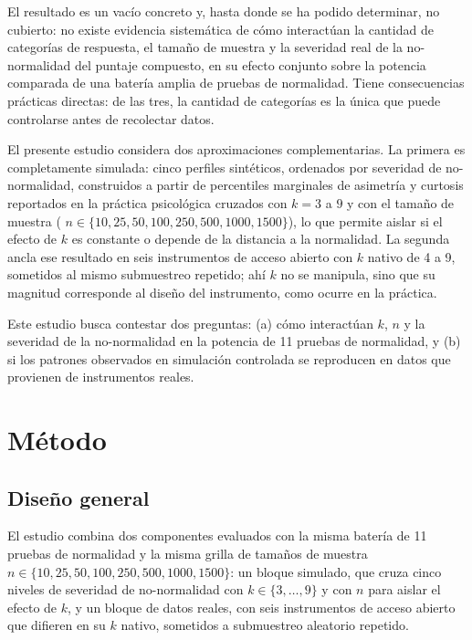 \documentclass[man,mask,donotrepeattitle,floatsintext]{apa7}
\begin{document}
El resultado es un vacío concreto y, hasta donde se ha podido determinar, no cubierto: no existe evidencia sistemática de cómo interactúan la cantidad de categorías de respuesta, el tamaño de muestra y la severidad real de la no-normalidad del puntaje compuesto, en su efecto conjunto sobre la potencia comparada de una batería amplia de pruebas de normalidad. Tiene consecuencias prácticas directas: de las tres, la cantidad de categorías es la única que puede controlarse antes de recolectar datos.

El presente estudio considera dos aproximaciones complementarias. La primera es completamente simulada: cinco perfiles sintéticos, ordenados por severidad de no-normalidad, construidos a partir de percentiles marginales de asimetría y curtosis reportados en la práctica psicológica \parencite{cain2017} cruzados con $k=3$ a $9$ y con el tamaño de muestra ( $n \in \{10, 25, 50, 100, 250, 500, 1000, 1500\}$), lo que permite aislar si el efecto de $k$ es constante o depende de la distancia a la normalidad. La segunda ancla ese resultado en seis instrumentos de acceso abierto con $k$ nativo de 4 a 9, sometidos al mismo submuestreo repetido; ahí $k$ no se manipula, sino que su magnitud corresponde al diseño del instrumento, como ocurre en la práctica.

Este estudio busca contestar dos preguntas: (a) cómo interactúan $k$, $n$ y la severidad de la no-normalidad en la potencia de 11 pruebas de normalidad, y (b) si los patrones observados en simulación controlada se reproducen en datos que provienen de instrumentos reales.

\section{Método}
\label{sec:method}

\subsection{Diseño general}
\label{sec:design}

El estudio combina dos componentes evaluados con la misma batería de 11 pruebas de normalidad y la misma grilla de tamaños de muestra $n \in \{10, 25, 50, 100, 250, 500, 1000, 1500\}$: un bloque simulado, que cruza cinco niveles de severidad de no-normalidad con $k \in \{3, \ldots, 9\}$ y con $n$ para aislar el efecto de $k$, y un bloque de datos reales, con seis instrumentos de acceso abierto que difieren en su $k$ nativo, sometidos a submuestreo aleatorio repetido.
\end{document}
